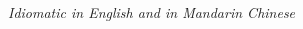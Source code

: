 \documentclass[10pt,a4paper,ragged2e,withhyper]{altacv}
\begin{document}
\begin{paracol}{2}

\bigskip

\textit{Idiomatic in English and in Mandarin Chinese}

















\end{paracol}
\end{document}
